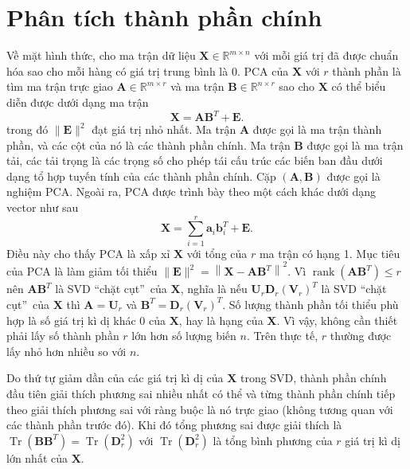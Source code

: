 \documentclass[12pt,a4paper,oneside]{report}
\numberwithin{equation}{section}
\begin{document}
\section{Phân tích thành phần chính}
Về mặt hình thức, cho ma trận dữ liệu $\mathbf{X} \in \mathbb{R}^{m \times n}$ với mỗi giá trị đã được chuẩn hóa sao cho mỗi hàng có giá trị trung bình là 0. PCA của $\mathbf{X}$ với $r$ thành phần là tìm ma trận trực giao $\mathbf{A} \in \mathbb{R}^{m \times r}$ và ma trận $\mathbf{B} \in \mathbb{R}^{n \times r}$ sao cho $\mathbf{X}$ có thể biểu diễn được dưới dạng ma trận
$$
\mathbf{X}=\mathbf{A} \mathbf{B}^{T}+\mathbf{E}.
$$
trong đó $\|\mathbf{E}\|^{2}$ đạt giá trị nhỏ nhất. Ma trận $\mathbf{A}$ được gọi là ma trận thành phần, và các cột của nó là các thành phần chính. Ma trận $\mathbf{B}$ được gọi là ma trận tải, các tải trọng là các trọng số cho phép tái cấu trúc các biến ban đầu dưới dạng tổ hợp tuyến tính của các thành phần chính. Cặp $(\mathbf{A}, \mathbf{B})$ được gọi là nghiệm PCA.
Ngoài ra, PCA được trình bày theo một cách khác dưới dạng vector như sau
$$
\mathbf{X}=\sum_{i=1}^{r} \mathbf{a}_{i} \mathbf{b}_{i}^{T}+\mathbf{E}.
$$
Điều này cho thấy $\mathrm{PCA}$ là xấp xỉ $\mathbf{X}$ với tổng của $r$ ma trận có hạng 1.
Mục tiêu của PCA là làm giảm tối thiểu $\|\mathbf{E}\|^{2}=\left\|\mathbf{X}-\mathbf{A} \mathbf{B}^{T}\right\|^{2}$. Vì $\operatorname{rank}\left(\mathbf{A} \mathbf{B}^{T}\right) \leq r$ nên $\mathbf{A} \mathbf{B}^{T}$ là SVD \textquotedblleft chặt cụt\textquotedblright\ của $\mathbf{X}$, nghĩa là nếu $\mathbf{U}_{r} \mathbf{D}_{r}\left(\mathbf{V}_{r}\right)^{T}$ là SVD \textquotedblleft chặt cụt\textquotedblright\   của $\mathbf{X}$ thì $\mathbf{A}= \mathbf{U}_{r}$ và $\mathbf{B}^{T}= \mathbf{D}_{r}\left(\mathbf{V}_{r}\right)^{T}$. Số lượng thành phần tối thiểu phù hợp là số giá trị kì dị khác 0 của $\mathbf{X}$, hay là hạng của $\mathbf{X}$. Vì vậy, không cần thiết phải lấy số thành phần $r$ lớn hơn số lượng biến $n$. Trên thực tế, $r$ thường được lấy nhỏ hơn nhiều so với $n$.

Do thứ tự giảm dần của các giá trị kì dị của $\mathbf{X}$ trong SVD, thành phần chính đầu tiên giải thích phương sai nhiều nhất có thể và từng thành phần chính tiếp theo giải thích phương sai với ràng buộc là nó trực giao (không tương quan với các thành phần trước đó). Khi đó tổng phương sai được giải thích là $\operatorname{Tr}\left(\mathbf{B} \mathbf{B}^{T}\right)=\operatorname{Tr}\left(\mathbf{D}_{r}^{2}\right)$ với $\operatorname{Tr}\left(\mathbf{D}_{r}^{2}\right)$ là tổng bình phương của $r$ giá trị kì dị lớn nhất của $\mathbf{X}$.
\end{document}
